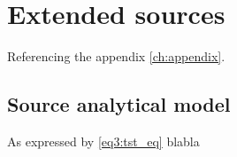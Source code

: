 \chapter{Extended sources}
\label{ch:extended}

Referencing the appendix \ref{ch:appendix}.
\section{Source analytical model}

As expressed by \eqref{eq3:tst_eq} blabla
